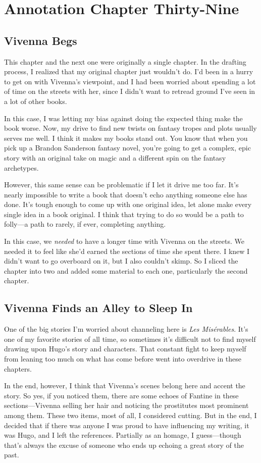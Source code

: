 \section{Annotation Chapter Thirty-Nine}

\subsection*{Vivenna Begs}

This chapter and the next one were originally a single chapter. In the drafting process, I realized that my original chapter just wouldn’t do. I’d been in a hurry to get on with Vivenna’s viewpoint, and I had been worried about spending a lot of time on the streets with her, since I didn’t want to retread ground I’ve seen in a lot of other books.

In this case, I was letting my bias against doing the expected thing make the book worse. Now, my drive to find new twists on fantasy tropes and plots usually serves me well. I think it makes my books stand out. You know that when you pick up a Brandon Sanderson fantasy novel, you’re going to get a complex, epic story with an original take on magic and a different spin on the fantasy archetypes.

However, this same sense can be problematic if I let it drive me too far. It’s nearly impossible to write a book that doesn’t echo anything someone else has done. It’s tough enough to come up with one original idea, let alone make every single idea in a book original. I think that trying to do so would be a path to folly—a path to rarely, if ever, completing anything.

In this case, we \textit{needed} to have a longer time with Vivenna on the streets. We needed it to feel like she’d earned the sections of time she spent there. I knew I didn’t want to go overboard on it, but I also couldn’t skimp. So I sliced the chapter into two and added some material to each one, particularly the second chapter.

\subsection*{Vivenna Finds an Alley to Sleep In}

One of the big stories I’m worried about channeling here is \textit{Les Misérables}. It’s one of my favorite stories of all time, so sometimes it’s difficult not to find myself drawing upon Hugo’s story and characters. That constant fight to keep myself from leaning too much on what has come before went into overdrive in these chapters.

In the end, however, I think that Vivenna’s scenes belong here and accent the story. So yes, if you noticed them, there are some echoes of Fantine in these sections—Vivenna selling her hair and noticing the prostitutes most prominent among them. These two items, most of all, I considered cutting. But in the end, I decided that if there was anyone I was proud to have influencing my writing, it was Hugo, and I left the references. Partially as an homage, I guess—though that’s always the excuse of someone who ends up echoing a great story of the past.



